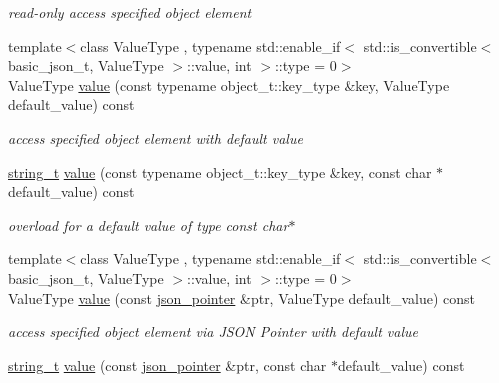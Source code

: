 \begin{DoxyCompactItemize}
\begin{DoxyCompactList}\small\item\em read-\/only access specified object element \end{DoxyCompactList}\item 
{\footnotesize template$<$class Value\+Type , typename std\+::enable\+\_\+if$<$ std\+::is\+\_\+convertible$<$ basic\+\_\+json\+\_\+t, Value\+Type $>$\+::value, int $>$\+::type  = 0$>$ }\\Value\+Type \hyperlink{classnlohmann_1_1basic__json_a9fa223b26419f018f9b18cc516e3a8e5}{value} (const typename object\+\_\+t\+::key\+\_\+type \&key, Value\+Type default\+\_\+value) const 
\begin{DoxyCompactList}\small\item\em access specified object element with default value \end{DoxyCompactList}\item 
\hyperlink{classnlohmann_1_1basic__json_a61f8566a1a85a424c7266fb531dca005}{string\+\_\+t} \hyperlink{classnlohmann_1_1basic__json_a1ad55f9d26934e05add021b2513a9ac1}{value} (const typename object\+\_\+t\+::key\+\_\+type \&key, const char $\ast$default\+\_\+value) const 
\begin{DoxyCompactList}\small\item\em overload for a default value of type const char$\ast$ \end{DoxyCompactList}\item 
{\footnotesize template$<$class Value\+Type , typename std\+::enable\+\_\+if$<$ std\+::is\+\_\+convertible$<$ basic\+\_\+json\+\_\+t, Value\+Type $>$\+::value, int $>$\+::type  = 0$>$ }\\Value\+Type \hyperlink{classnlohmann_1_1basic__json_a3284c24ad6b089558d78f256ada9c295}{value} (const \hyperlink{classnlohmann_1_1basic__json_a32d3ee58bf01b28d11366f307518bf34}{json\+\_\+pointer} \&ptr, Value\+Type default\+\_\+value) const 
\begin{DoxyCompactList}\small\item\em access specified object element via J\+S\+ON Pointer with default value \end{DoxyCompactList}\item 
\hyperlink{classnlohmann_1_1basic__json_a61f8566a1a85a424c7266fb531dca005}{string\+\_\+t} \hyperlink{classnlohmann_1_1basic__json_af6a68b55f28fcce225017920de1435db}{value} (const \hyperlink{classnlohmann_1_1basic__json_a32d3ee58bf01b28d11366f307518bf34}{json\+\_\+pointer} \&ptr, const char $\ast$default\+\_\+value) const 

\end{DoxyCompactItemize}
